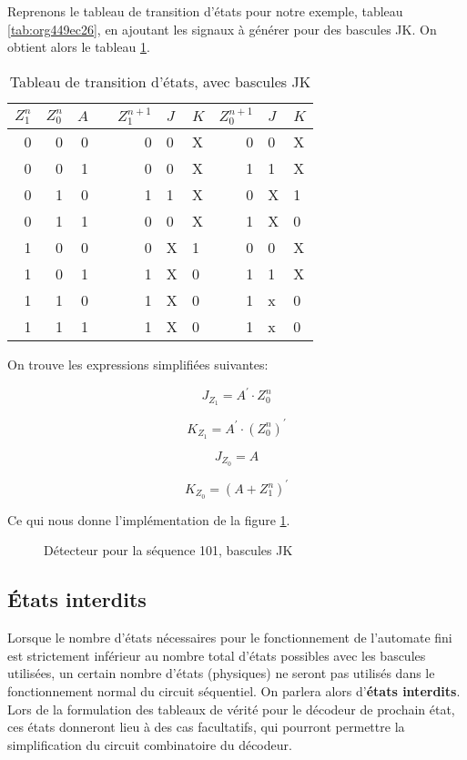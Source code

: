 \documentclass[11pt]{article}
\begin{document}
Reprenons le tableau de transition d'états pour notre exemple, tableau
\ref{tab:org449ec26}, en ajoutant les signaux à générer pour des
bascules JK. On obtient alors le tableau \ref{tab:org133761a}.

\begin{table}[htbp]
\caption{\label{tab:org133761a}Tableau de transition d'états, avec bascules JK}
\centering
\begin{tabular}{rrrlrllrll}
\(Z_1^n\) & \(Z_0^n\) & \(A\) &  & \(Z_1^{n+1}\) & \(J\) & \(K\) & \(Z_0^{n+1}\) & \(J\) & \(K\)\\[0pt]
\hline
0 & 0 & 0 &  & 0 & 0 & X & 0 & 0 & X\\[0pt]
0 & 0 & 1 &  & 0 & 0 & X & 1 & 1 & X\\[0pt]
0 & 1 & 0 &  & 1 & 1 & X & 0 & X & 1\\[0pt]
0 & 1 & 1 &  & 0 & 0 & X & 1 & X & 0\\[0pt]
1 & 0 & 0 &  & 0 & X & 1 & 0 & 0 & X\\[0pt]
1 & 0 & 1 &  & 1 & X & 0 & 1 & 1 & X\\[0pt]
1 & 1 & 0 &  & 1 & X & 0 & 1 & x & 0\\[0pt]
1 & 1 & 1 &  & 1 & X & 0 & 1 & x & 0\\[0pt]
\end{tabular}
\end{table}

On trouve les expressions simplifiées suivantes:

$$ J_{Z_1} = A^\prime \cdot Z_0^n $$

$$ K_{Z_1} = A^\prime \cdot (Z_0^n)^\prime $$

$$ J_{Z_0} = A $$ 

$$ K_{Z_0} = (A + Z_1^n)^\prime $$

Ce qui nous donne l'implémentation de la figure \ref{fig:org30b47f8}.

\begin{figure}[htbp]
\centering

\caption{\label{fig:org30b47f8}Détecteur pour la séquence 101, bascules JK}
\end{figure}

\subsection{États interdits}
\label{sec:org394a5b9}

Lorsque le nombre d'états nécessaires pour le fonctionnement de
l'automate fini est strictement inférieur au nombre total d'états
possibles avec les bascules utilisées, un certain nombre d'états
(physiques) ne seront pas utilisés dans le fonctionnement normal du
circuit séquentiel. On parlera alors d'\textbf{états interdits}.  Lors de la
formulation des tableaux de vérité pour le décodeur de prochain état,
ces états donneront lieu à des cas facultatifs, qui pourront permettre
la simplification du circuit combinatoire du décodeur.
\end{document}
